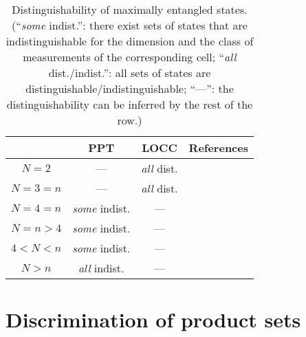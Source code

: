 \begin{table}[!ht]
\centering
\def\arraystretch{1.5}
\begin{tabular}{|c|c|c|c|}
  \hline
    & PPT & LOCC & References\\
  \hline \hline
  $N = 2$     & --- & \emph{all} dist. & \cite{Walgate00}\\
  \hline
  $N = 3 = n$ & --- & \emph{all} dist. & \cite{Nathanson05}\\
  \hline 
  $N = 4 = n$ & \emph{some} indist. & --- & \cite{Yu12}\\
  \hline
  \rowcolor{Gray}
  $N = n > 4$ & \emph{some} indist. & --- & \cite{Cosentino13}\\
  \hline
  \rowcolor{Gray}
  $4 < N < n$ & \emph{some} indist. & --- & \cite{Cosentino14,Bandyopadhyay15}\\
  \hline
  $N > n$     & \emph{all} indist. & --- & \cite{Yu12,Duan09,Ghosh04} \\
  \hline
\end{tabular}
\caption[Distinguishability of maximally entangled states]{Distinguishability of 
    maximally entangled states. (``\emph{some} indist.'': 
    there exist sets of states that are indistinguishable 
    for the dimension and the class of measurements of the corresponding cell;
    ``\emph{all} dist./indist.'': all sets of states are distinguishable/indistinguishable; 
    ``---'': the distinguishability can be inferred by the rest of the row.)
}
\label{table:max-ent-states}
\end{table}

\section{Discrimination of product sets}


